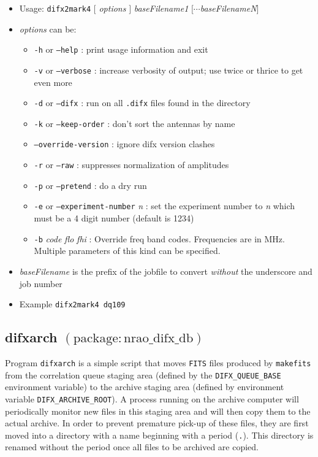 \begin{itemize}
\item[] Usage: {\tt difx2mark4} $[$ {\em options} $]$ {\em baseFilename1} $[\cdots${\em baseFilenameN}$]$
\item[] {\em options} can be:
\begin{itemize}
\item[] {\tt -h} or {\tt --help} : print usage information and exit
\item[] {\tt -v} or {\tt --verbose} : increase verbosity of output; use twice or thrice to get even more
\item[] {\tt -d} or {\tt --difx} : run on all {\tt .difx} files found in the directory
\item[] {\tt -k} or {\tt --keep-order} : don't sort the antennas by name
\item[] {\tt --override-version} : ignore difx version clashes
\item[] {\tt -r} or {\tt --raw} : suppresses normalization of amplitudes
\item[] {\tt -p} or {\tt --pretend} : do a dry run
\item[] {\tt -e} or {\tt --experiment-number} {\em n} : set the experiment number to {\em n} which must be a 4 digit number (default is 1234)
\item[] {\tt -b} {\em code} {\em flo} {\em fhi} : Override freq band codes.  Frequencies are in MHz.  Multiple parameters of this kind can be specified.
\end{itemize}
\item[] {\em baseFilename} is the prefix of the jobfile to convert {\em without} the underscore and job number
\item[] Example {\tt difx2mark4 dq109}
\end{itemize}







\subsection{difxarch {\small $\mathrm{(package: nrao\_difx\_db)}$}} \label{sec:difxarch}

Program {\tt difxarch} is a simple script that moves {\tt FITS} files produced by {\tt makefits} from the correlation queue staging area (defined by the {\tt DIFX\_QUEUE\_BASE} environment variable) to the archive staging area (defined by environment variable {\tt DIFX\_ARCHIVE\_ROOT}).
A process running on the archive computer will periodically monitor new files in this staging area and will then copy them to the actual archive.
In order to prevent premature pick-up of these files, they are first moved into a directory with a name beginning with a period ({\tt .}).
This directory is renamed without the period once all files to be archived are copied.

